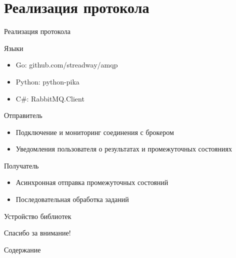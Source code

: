 \documentclass[xetex,mathserif,serif,10pt]{beamer}
\newenvironment{sframe}[2]{\section{#1}\begin{frame}[label=#2]{#1}}{\end{frame}}
\begin{document}
    \begin{sframe}{Реализация протокола}{binddev}
        \begin{block}{Языки}
            \begin{itemize}
                \item Go: github.com/streadway/amqp
                \item Python: python-pika
                \item C\#: RabbitMQ.Client
            \end{itemize}
        \end{block}
        \begin{block}{Отправитель}
            \begin{itemize}
                \item Подключение и мониторинг соединения с брокером
                \item Уведомления пользователя о результатах и промежуточных
                    состояниях
            \end{itemize}
        \end{block}
        \begin{block}{Получатель}
            \begin{itemize}
                \item Асинхронная отправка промежуточных состояний
                \item Последовательная обработка заданий
            \end{itemize}
        \end{block}
    \end{sframe}

    \begin{frame}{Устройство библиотек}
        \begin{figure}
            \centering
        \end{figure}
    \end{frame}

    \begin{frame}
        \Large\centering Спасибо за внимание!
    \end{frame}

    \begin{frame}{Содержание}
        \tableofcontents
    \end{frame}
\end{document}

